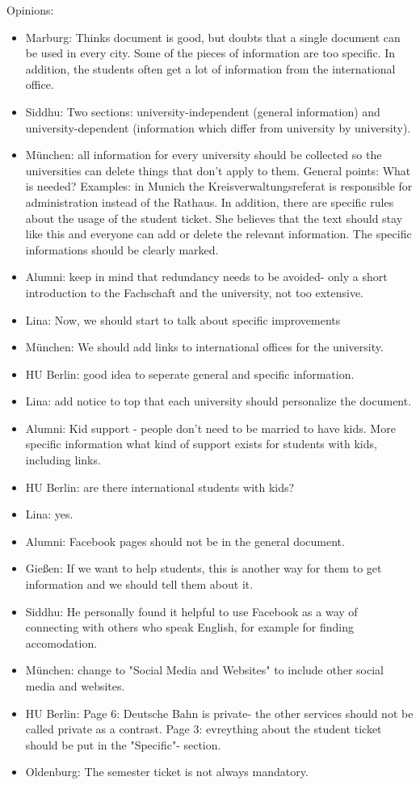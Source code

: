     Opinions:
    \begin{itemize}
      \item Marburg: Thinks document is good, but doubts that a single document can be used in every city. Some of the pieces of information are too specific. In addition, the students often get a lot of information from the international office.
      \item Siddhu: Two sections: university-independent (general information) and university-dependent (information which differ from university by university).
      \item München: all information for every university should be collected so the universities can delete things that don't apply to them. General points: What is needed? Examples: in Munich the Kreisverwaltungsreferat is responsible for administration instead of the Rathaus. In addition, there are specific rules about the usage of the student ticket. She believes that the text should stay like this and everyone can add or delete the relevant information. The specific informations should be clearly marked.
      \item Alumni: keep in mind that redundancy needs to be avoided- only a short introduction to the Fachschaft and the university, not too extensive.
      \item Lina: Now, we should start to talk about specific improvements
      \item München: We should add links to international offices for the university.
      \item HU Berlin: good idea to seperate general and specific information.
      \item Lina: add notice to top that each university should personalize the document.
      \item Alumni: Kid support - people don't need to be married to have kids. More specific information what kind of support exists for students with kids, including links.
      \item HU Berlin: are there international students with kids?
      \item Lina: yes.
      \item Alumni: Facebook pages should not be in the general document.
      \item Gießen: If we want to help students, this is another way for them to get information and we should tell them about it.
      \item Siddhu: He personally found it helpful to use Facebook as a way of connecting with others who speak English, for example for finding accomodation.
      \item München: change to "Social Media and Websites" to include other social media and websites.
      \item HU Berlin: Page 6: Deutsche Bahn is private- the other services should not be called private as a contrast. Page 3: evreything about the student ticket should be put in the "Specific"- section.
      \item Oldenburg: The semester ticket is not always mandatory.
    \end{itemize}

